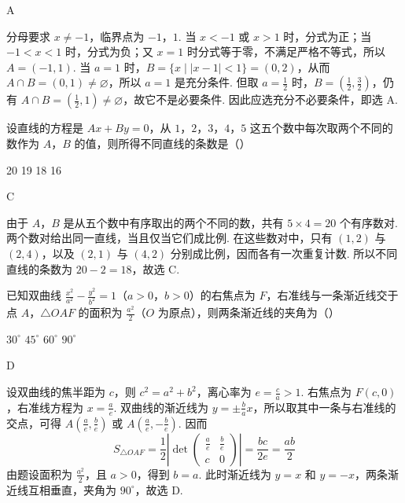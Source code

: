 \begin{answer}
A
\end{answer}

\begin{solution}
分母要求 \(x\neq-1\)，临界点为 \(-1\)，\(1\). 当 \(x<-1\) 或 \(x>1\) 时，分式为正；当 \(-1<x<1\) 时，分式为负；又 \(x=1\) 时分式等于零，不满足严格不等式，所以 \(A=(-1,1)\). 当 \(a=1\) 时，\(B=\{x\mid |x-1|<1\}=(0,2)\)，从而 \(A\cap B=(0,1)\neq\varnothing\)，所以 \(a=1\) 是充分条件. 但取 \(a=\frac12\) 时，\(B=\left(\frac12,\frac32\right)\)，仍有 \(A\cap B=\left(\frac12,1\right)\neq\varnothing\)，故它不是必要条件. 因此应选充分不必要条件，即选 A.
\end{solution}

\begin{problem}
设直线的方程是 \(Ax + By = 0\)，从 \(1\)，\(2\)，\(3\)，\(4\)，\(5\) 这五个数中每次取两个不同的数作为 \(A\)，\(B\) 的值，则所得不同直线的条数是（\quad）

\choices
    {20}
    {19}
    {18}
    {16}
\end{problem}

\begin{answer}
C
\end{answer}

\begin{solution}
由于 \(A\)，\(B\) 是从五个数中有序取出的两个不同的数，共有 \(5\times4=20\) 个有序数对. 两个数对给出同一直线，当且仅当它们成比例. 在这些数对中，只有 \((1,2)\) 与 \((2,4)\)，以及 \((2,1)\) 与 \((4,2)\) 分别成比例，因而各有一次重复计数. 所以不同直线的条数为 \(20-2=18\)，故选 C.
\end{solution}

\begin{problem}
已知双曲线 \(\frac{x^2}{a^2} - \frac{y^2}{b^2} = 1\)（\(a > 0\)，\(b > 0\)）的右焦点为 \(F\)，右准线与一条渐近线交于点 \(A\)，\(\triangle OAF\) 的面积为 \(\frac{a^2}{2}\)（\(O\) 为原点），则两条渐近线的夹角为（\quad）

\choices
    {\(30^{\circ}\)}
    {\(45^{\circ}\)}
    {\(60^{\circ}\)}
    {\(90^{\circ}\)}
\end{problem}

\begin{answer}
D
\end{answer}

\begin{solution}
设双曲线的焦半距为 \(c\)，则 \(c^2=a^2+b^2\)，离心率为 \(e=\frac ca>1\). 右焦点为 \(F(c,0)\)，右准线方程为 \(x=\frac ae\). 双曲线的渐近线为 \(y=\pm\frac ba x\)，所以取其中一条与右准线的交点，可得 \(A\left(\frac ae,\frac be\right)\) 或 \(A\left(\frac ae,-\frac be\right)\). 因而
\[
S_{\triangle OAF}=\frac12\left|\det\begin{pmatrix}\frac ae&\frac be\\ c&0\end{pmatrix}\right|=\frac{bc}{2e}=\frac{ab}{2}
\]
由题设面积为 \(\frac{a^2}{2}\)，且 \(a>0\)，得到 \(b=a\). 此时渐近线为 \(y=x\) 和 \(y=-x\)，两条渐近线互相垂直，夹角为 \(90^{\circ}\)，故选 D.
\end{solution}

